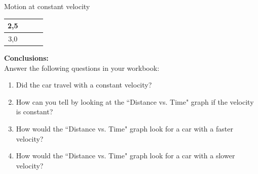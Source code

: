 \begin{g_experiment}{Motion at constant velocity }
\begin{center}
\begin{tabular}{|c|p{0.5cm}|p{0.5cm}|p{0.5cm}|}
2,5&&&\\\hline
3,0&&&\\\hline
\end{tabular}
\end{center}
    \par
        \label{m38795*id71722}\noindent{}\textbf{Conclusions:}\\
Answer the following questions in your workbook:
        \label{m38795*id71746}\begin{enumerate}[noitemsep, label=\textbf{\arabic*}. ] 
            \label{m38795*uid108}\item Did the car travel with a constant velocity?
\label{m38795*uid109}\item How can you tell by looking at the ``Distance vs. Time" graph if the velocity is constant?
\label{m38795*uid110}\item How would the ``Distance vs. Time" graph look for a car with a faster velocity?
\label{m38795*uid111}\item How would the ``Distance vs. Time" graph look for a car with a slower velocity?
\end{enumerate}
\end{g_experiment}
        \par 
      \label{m38795*uid112}
